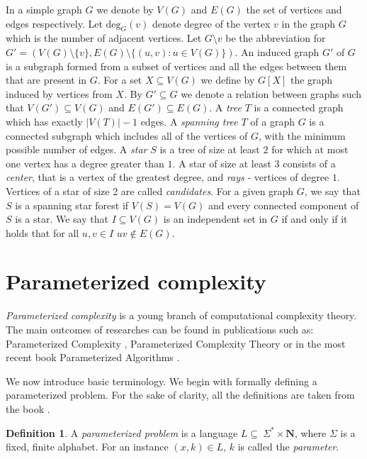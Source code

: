 \documentclass[en]{pracamgr}
\theoremstyle{definition}
\newtheorem{definition}{Definition}
\newcommand{\ssf}{spanning star forest}
\newcommand{\degree}[2]{\textrm{deg}_{#1}(#2)}
\begin{document}
In a simple graph $G$ we denote by $V(G)$ and $E(G)$ the set of vertices and edges respectively. 
Let $\degree{G}{v}$ denote degree of the vertex $v$ in the graph $G$ which is the number of adjacent vertices. 
Let $G \setminus v$ be the abbreviation for $G'=(V(G) \setminus \{v\}, E(G) \setminus \{(u,v): u \in V(G)\})$. 
An induced graph $G'$ of $G$ is a subgraph formed from a subset of vertices and all the edges between them that are present in $G$. For a set $X \subseteq V(G)$ we define by $G[X]$ the graph induced by vertices from $X$. 
By $G' \subseteq G$ we denote a relation between graphs such that $V(G') \subseteq V(G)$ and $E(G') \subseteq E(G)$.
A \emph{tree} $T$ is a connected graph which has exactly $|V(T)|-1$ edges. 
A \emph{spanning tree} $T$ of a graph $G$ is a connected subgraph which includes all of the vertices of $G$, with the minimum possible number of edges.
A \emph{star} $S$ is a tree of size at least $2$ for which at most one vertex has a degree greater than $1$. 
A star of size at least $3$ consists of a \emph{center}, that is a vertex of the greatest degree, and \emph{rays} - vertices of degree $1$. 
Vertices of a star of size 2 are called \emph{candidates}.
For a given graph $G$, we say that $S$ is a \ssf{} if $V(S)=V(G)$ and every connected component of $S$ is a star.
We say that $I \subseteq V(G)$ is an independent set in $G$ if and only if it holds that for all $u,v \in I$ $uv \notin E(G)$.

\section{Parameterized complexity}

\emph{Parameterized complexity} is a young branch of computational complexity theory. The main outcomes of researches can be found in publications such as: Parameterized Complexity \cite{ParComp}, Parameterized Complexity Theory \cite{ParCompThm} or in the most recent book Parameterized Algorithms \cite{ParAlg}.

We now introduce basic terminology. We begin with formally defining a parameterized problem. For the sake of clarity, all the definitions are taken from the book \cite{ParAlg}.

\begin{definition}\label{Parameterized problem}
	A \textit{parameterized problem} is a language $L \subseteq \ \Sigma^* \times \mathbf{N}$, where $\Sigma$ is a fixed, finite alphabet. For an instance $(x,k) \in L$, $k$ is called the \textit{parameter}.
\end{definition}
\end{document}
